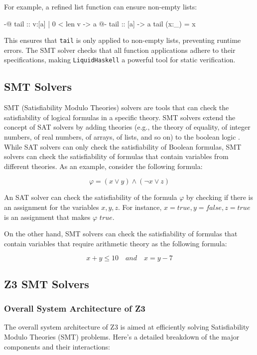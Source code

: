 \documentclass[]{rptuseminar}
\begin{document}
For example, a refined list function can ensure non-empty lists:

\begin{haskell}
{-@ tail :: {v:[a] | 0 < len v} -> a @-}
tail :: [a] -> a
tail (x:_) = x
\end{haskell}

This ensures that \texttt{tail} is only applied to non-empty lists, preventing runtime errors. 
The SMT solver checks that all function applications adhere to their specifications, 
making \texttt{LiquidHaskell} a powerful tool for static verification.

\subsection{SMT Solvers}
SMT (Satisfiability Modulo Theories) solvers are tools that can check the satisfiability of logical formulas in a specific theory.
SMT solvers extend the concept of SAT solvers by adding theories (e.g., the theory of equality, 
of integer numbers, of real numbers, of arrays, of lists, and so on) to the boolean logic \cite{clarke_satisfiability_2018}.
While SAT solvers can only check the satisfiability of Boolean formulas, SMT solvers can check the satisfiability of formulas 
that contain variables from different theories. 
As an example, consider the following formula:

\begin{equation}
  \varphi = (x \lor y) \land (\lnot x \lor z)
\end{equation}

An SAT solver can check the satisfiability of the formula \(\varphi\) by checking if there is an assignment for the variables \(x, y, z\).
For instance, \(x = true, y = false, z = true\) is an assignment that makes \(\varphi\) \(true\). 

On the other hand, SMT solvers can check the satisfiability of formulas that contain variables that require arithmetic theory as the following formula:

\begin{equation}
  x + y \leq 10 \quad and \quad x = y - 7
\end{equation}

\subsection{Z3 SMT Solvers}
\subsubsection*{Overall System Architecture of Z3}
The overall system architecture of Z3 is aimed at eﬃciently solving Satisfiability Modulo Theories (SMT) problems. Here's a detailed breakdown of the major components and their interactions:
\end{document}
